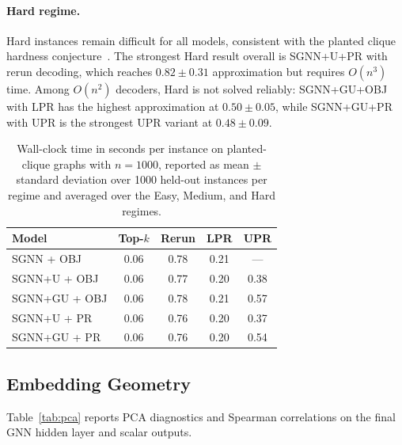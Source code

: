 \documentclass[11pt]{article}
\theoremstyle{plain}
\theoremstyle{remark}
\begin{document}
\paragraph{Hard regime.}
Hard instances remain difficult for all models, consistent with the planted clique
hardness conjecture~\citep{manurangsi2021}. The strongest Hard result overall is
SGNN+U+PR with rerun decoding, which reaches $0.82{\pm}0.31$ approximation but
requires $O(n^3)$ time. Among $O(n^2)$ decoders, Hard is not solved reliably:
SGNN+GU+OBJ with LPR has the highest approximation at $0.50{\pm}0.05$, while
SGNN+GU+PR with UPR is the strongest UPR variant at $0.48{\pm}0.09$.

\begin{table}[t]
  \centering
  \caption{Wall-clock time in seconds per instance on planted-clique graphs with
    $n=1000$, reported as mean $\pm$ standard deviation over 1000 held-out instances
  per regime and averaged over the Easy, Medium, and Hard regimes.}
  \label{tab:timing}
  \begin{tabular}{lcccc}
    \toprule
    Model & Top-$k$ & Rerun & LPR & UPR \\
    \midrule
    SGNN + OBJ      & 0.06 & 0.78 & 0.21 & --- \\
    SGNN+U + OBJ    & 0.06 & 0.77 & 0.20 & 0.38 \\
    SGNN+GU + OBJ   & 0.06 & 0.78 & 0.21 & 0.57 \\
    SGNN+U + PR     & 0.06 & 0.76 & 0.20 & 0.37 \\
    SGNN+GU + PR    & 0.06 & 0.76 & 0.20 & 0.54 \\
    \bottomrule
  \end{tabular}
\end{table}


\subsection{Embedding Geometry}
\label{sec:pca}

Table~\ref{tab:pca} reports PCA diagnostics and Spearman correlations on the final
GNN hidden layer and scalar outputs.
\end{document}
